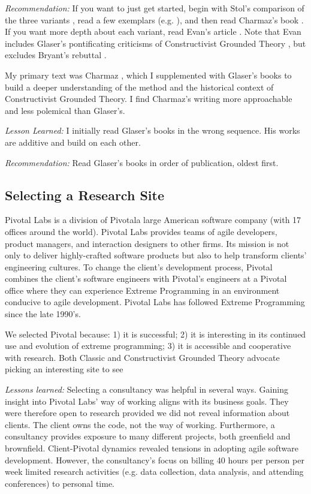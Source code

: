 \textit{Recommendation:} If you want to just get started, begin with Stol's comparison of the three variants \cite{StolGroundedTheory}, read a few exemplars (e.g. \cite{SedanoSustainableSoftware, SedanoSoftwareDevelopmentWaste}), and then read Charmaz's book \cite{Charmaz}. If you want more depth about each variant, read Evan's article \cite{Evans2013novice}. Note that Evan includes Glaser's pontificating criticisms of Constructivist Grounded Theory \cite{GlaserConstructivistGroundedTheory}, but excludes Bryant's rebuttal \cite{Bryant2007}. 

My primary text was Charmaz \cite{Charmaz}, which I supplemented with Glaser's books \cite{GlaserDiscovery, GlaserTheoreticalSensitivity, GlaserIssues} to build a deeper understanding of the method and the historical context of Constructivist Grounded Theory. I find Charmaz's writing more approachable and less polemical than Glaser's. 

\textit{Lesson Learned:} I initially read Glaser's books in the wrong sequence. His works are additive and build on each other.

\textit{Recommendation:} Read Glaser's books in order of publication, oldest first. 
\subsection{Selecting a Research Site}
Pivotal Labs is a division of Pivotal\textemdash a large American software company (with 17 offices around the world). Pivotal Labs provides teams of agile developers, product managers, and interaction designers to other firms. Its mission is not only to deliver highly-crafted software products but also to help transform clients' engineering cultures. To change the client's development process, Pivotal combines the client's software engineers with Pivotal's engineers at a Pivotal office where they can experience Extreme Programming \cite{BeckExtremeProgramming2004} in an environment conducive to agile development. Pivotal Labs has followed Extreme Programming \cite{BeckExtremeProgramming2004} since the late 1990's. 

We selected Pivotal because: 1) it is successful; 2) it is interesting in its continued use and evolution of extreme programming; 3) it is accessible and cooperative with research. Both Classic and Constructivist Grounded Theory advocate picking an interesting site to see  

\textit{Lessons learned:} Selecting a consultancy was helpful in several ways. Gaining insight into Pivotal Labs' way of working aligns with its business goals. They were therefore open to research provided we did not reveal information about clients. The client owns the code, not the way of working. Furthermore, a consultancy provides exposure to many different projects, both greenfield and brownfield. Client-Pivotal dynamics revealed tensions in adopting agile software development. However, the consultancy's focus on billing 40 hours per person per week limited research activities (e.g. data collection, data analysis, and attending conferences) to personal time.

